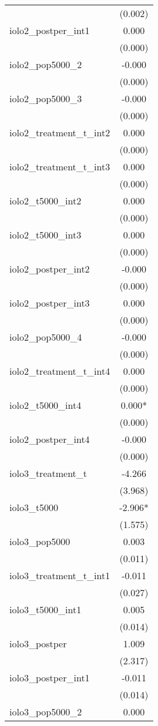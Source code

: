 \documentclass[]{article}
\begin{document}
\begin{tabular}{lc}
 & (0.002) \\
iolo2\_postper\_int1 & 0.000 \\
 & (0.000) \\
iolo2\_pop5000\_2 & -0.000 \\
 & (0.000) \\
iolo2\_pop5000\_3 & -0.000 \\
 & (0.000) \\
iolo2\_treatment\_t\_int2 & 0.000 \\
 & (0.000) \\
iolo2\_treatment\_t\_int3 & 0.000 \\
 & (0.000) \\
iolo2\_t5000\_int2 & 0.000 \\
 & (0.000) \\
iolo2\_t5000\_int3 & 0.000 \\
 & (0.000) \\
iolo2\_postper\_int2 & -0.000 \\
 & (0.000) \\
iolo2\_postper\_int3 & 0.000 \\
 & (0.000) \\
iolo2\_pop5000\_4 & -0.000 \\
 & (0.000) \\
iolo2\_treatment\_t\_int4 & 0.000 \\
 & (0.000) \\
iolo2\_t5000\_int4 & 0.000* \\
 & (0.000) \\
iolo2\_postper\_int4 & -0.000 \\
 & (0.000) \\
iolo3\_treatment\_t & -4.266 \\
 & (3.968) \\
iolo3\_t5000 & -2.906* \\
 & (1.575) \\
iolo3\_pop5000 & 0.003 \\
 & (0.011) \\
iolo3\_treatment\_t\_int1 & -0.011 \\
 & (0.027) \\
iolo3\_t5000\_int1 & 0.005 \\
 & (0.014) \\
iolo3\_postper & 1.009 \\
 & (2.317) \\
iolo3\_postper\_int1 & -0.011 \\
 & (0.014) \\
iolo3\_pop5000\_2 & 0.000 \\

\end{tabular}
\end{document}
